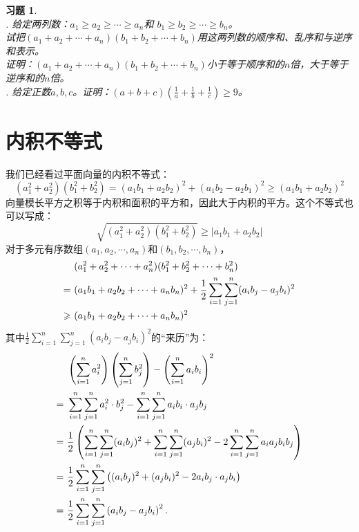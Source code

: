\documentclass[12pt,UTF8]{ctexbook}
\newtheorem{xt}{习题}[section]
\begin{document}
\begin{xt}    
    \mbox{}\\
    . 给定两列数：$a_1 \geqslant a_2 \geqslant \cdots \geqslant a_n$和
$b_1 \geqslant b_2 \geqslant \cdots \geqslant b_n$。\\
     试把$(a_1 + a_2 + \cdots + a_n)(b_1 + b_2 + \cdots + b_n)$用这两列数的顺序和、乱序和与逆序和表示。\\
     证明：$(a_1 + a_2 + \cdots + a_n)(b_1 + b_2 + \cdots + b_n)$小于等于顺序和的$n$倍，大于等于逆序和的$n$倍。 \\
    . 给定正数$a,b,c$。证明：$(a + b + c)(\frac{1}{a}+\frac{1}{b}+\frac{1}{c}) \geqslant 9$。
\end{xt}

\section{内积不等式}

我们已经看过平面向量的内积不等式：
$$
(a_1^2 + a_2^2)(b_1^2 + b_2^2) = (a_1b_1 + a_2b_2)^2 + (a_1b_2 - a_2b_1)^2 \geqslant (a_1b_1 + a_2b_2)^2
$$
向量模长平方之积等于内积和面积的平方和，因此大于内积的平方。这个不等式也可以写成：
$$
\sqrt{(a_1^2 + a_2^2)(b_1^2 + b_2^2)} \geqslant |a_1b_1 + a_2b_2|
$$
对于多元有序数组$(a_1, a_2, \cdots, a_n)$和$(b_1, b_2, \cdots, b_n)$，
\begin{align}
&(a_1^2 + a_2^2 + \cdots + a_n^2)(b_1^2 + b_2^2 + \cdots + b_n^2) \notag \\
=\,\,& (a_1b_1 + a_2b_2 + \cdots + a_nb_n)^2 + \frac{1}{2}\sum_{i=1}^n\sum_{j=1}^n(a_ib_j - a_jb_i)^2 \notag \\
\geqslant\,\,& (a_1b_1 + a_2b_2 + \cdots + a_nb_n)^2 \notag 
\end{align}
其中$\frac{1}{2}\sum_{i=1}^n\sum_{j=1}^n(a_ib_j - a_jb_i)^2$的“来历”为：
\begin{align}
&\left(\sum_{i=1}^n a_i^2\right) \left(\sum_{j=1}^n b_j^2\right) - \left(\sum_{i=1}^n a_ib_i\right)^2 \notag \\
=\,\,& \sum_{i=1}^n\sum_{j=1}^n a_i^2 \cdot b_j^2 - \sum_{i=1}^n\sum_{j=1}^n a_ib_i\cdot a_jb_j \notag \\
=\,\,& \frac{1}{2}\left(\sum_{i=1}^n\sum_{j=1}^n (a_ib_j)^2 + \sum_{i=1}^n\sum_{j=1}^n (a_jb_i)^2 -  2 \sum_{i=1}^n\sum_{j=1}^n a_ia_jb_ib_j \right) \notag \\
=\,\,& \frac{1}{2}\sum_{i=1}^n\sum_{j=1}^n \left( (a_ib_j)^2 + (a_jb_i)^2 -  2 a_ib_j\cdot a_jb_i \right) \notag \\ 
=\,\,& \frac{1}{2}\sum_{i=1}^n\sum_{j=1}^n \left( a_ib_j - a_jb_i \right)^2. \notag 
\end{align}
\end{document}
